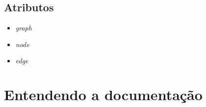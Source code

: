 \documentclass[a4paper,12pt]{article}
\begin{document}
    \subsection{Atributos}

      \begin{itemize}
        \item{\emph{graph}}

        \item{\emph{node}}

        \item{\emph{edge}}
      \end{itemize}

  \section{Entendendo a documentação}
\end{document}
